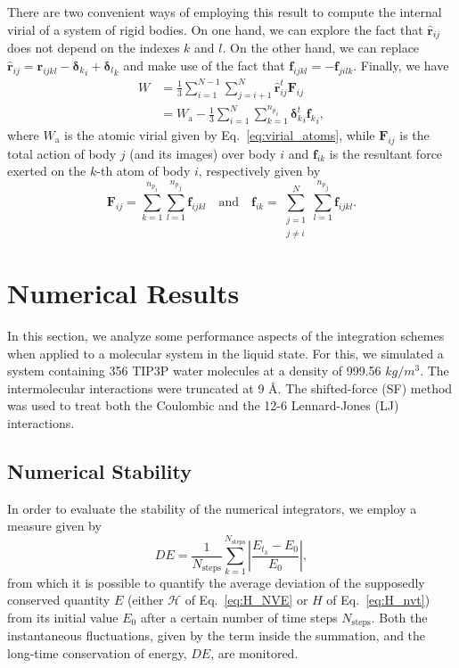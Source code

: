 \documentclass[aip,jcp,reprint,amsmath,amssymb,raggedbottom]{revtex4-1}
\newcommand{\vt}[1]{\boldsymbol{\mathbf{#1}}}           %
\newcommand{\tr}[1]{#1^t}                               %
\begin{document}
There are two convenient ways of employing this result to compute the internal virial of a system of rigid bodies. On one hand, we can explore the fact that ${\hat{\vt r}}_{ij}$ does not depend on the indexes $k$ and $l$. On the other hand, we can replace $\hat{\vt r}_{ij} = {\vt r}_{ijkl} - {{\vt \delta}_k}_i + {{\vt \delta}_l}_k$ and make use of the fact that $\vt f_{ijkl} = -\vt f_{jilk}$. Finally, we have
\begin{subequations}
	\label{eq:virial_rigid_bodies}
	\begin{align}
	W &= \frac{1}{3} \sum_{i=1}^{N-1} \sum_{j=i+1}^N \tr{\hat{\vt r}}_{ij} \vt F_{ij} \\
	  &= W_\text{a} - \frac{1}{3} \sum_{i=1}^N \sum_{k=1}^{{n_p}_i} {\tr{\vt \delta}_k}_i {{\vt f}_k}_i,
	\end{align}
\end{subequations}
where $W_\text{a}$ is the atomic virial given by Eq.~\ref{eq:virial_atoms}, while $\vt F_{ij}$ is the total action of body $j$ (and its images) over body $i$ and $\vt f_{ik}$ is the resultant force exerted on the $k$-th atom of body $i$, respectively given by
\
\[
\vt F_{ij} = \sum_{k=1}^{{n_p}_i} \sum_{l=1}^{{n_p}_j} \vt f_{ijkl} \quad \text{and} \quad \vt f_{ik} = \sum_{\substack{j=1\\j \neq i}}^N \sum_{l=1}^{{n_p}_j} \vt f_{ijkl}.
\]

\section{Numerical Results}
\label{sec:numerical_results}

In this section, we analyze some performance aspects of the integration schemes when applied to a molecular system in the liquid state. For this, we simulated a system containing 356 TIP3P water molecules\cite{Price2004} at a density of 999.56 $kg/m^3$. The intermolecular interactions were truncated at 9 \AA. The shifted-force (SF) method\cite{Allen1989, Fennell2006, Toxvaerd_2011} was used to treat both the Coulombic and the 12-6 Lennard-Jones (LJ) interactions.

\subsection{Numerical Stability}
\label{sec:performance}

In order to evaluate the stability of the numerical integrators, we employ a measure given by\cite{Tuckerman2010}
\begin{equation}
\label{eq:performance}
D\!E =  \frac{1}{N_\text{steps}} \sum_{k=1}^{N_\text{steps}} \left| \frac{E_{t_k} - E_0}{E_0} \right|,
\end{equation}
from which it is possible to quantify the average deviation of the supposedly conserved quantity $E$ (either $\mathcal{H}$ of Eq.~\ref{eq:H_NVE} or $H$ of Eq.~\ref{eq:H_nvt}) from its initial value $E_0$ after a certain number of time steps $N_\text{steps}$. Both the instantaneous fluctuations, given by the term inside the summation, and the long-time conservation of energy, $D\!E$, are monitored.
\end{document}
